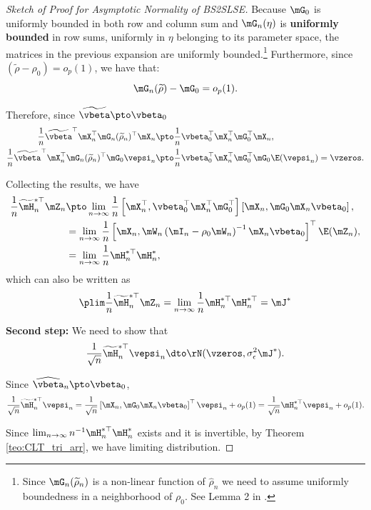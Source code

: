 \documentclass[english,12pt]{book}\usepackage[]{graphicx}\usepackage[]{xcolor}
\begin{document}
\begin{proof}[Sketch of Proof for Asymptotic Normality of BS2SLSE]
Because $\mG_0$ is uniformly bounded in both row and column sum and $\mG_n(\eta)$ is \textbf{uniformly bounded} in row sums, uniformly in $\eta$ belonging to its parameter space, the matrices in the previous expansion are uniformly bounded.\footnote{Since $\mG_n(\widetilde{\rho}_n)$ is a non-linear function of $\widehat{\rho}_n$ we need to assume uniformly boundedness in a neighborhood of $\rho_0$. See Lemma 2 in \cite{lee2003best}.} Furthermore, since $\left(\widetilde{\rho} - \rho_0\right) = o_p(1)$, we have that:
\begin{equation*}
\mG_n(\widetilde{\rho}) -  \mG_0  = o_p(1).
\end{equation*}

Therefore, since $\widetilde{\vbeta}\pto \vbeta_0$
\begin{equation*}
\begin{aligned}
\frac{1}{n}\widetilde{\vbeta}^\top\mX_n^\top \mG_n(\widetilde{\rho}_n)^\top\mX_n & \pto \frac{1}{n}\vbeta_0^\top\mX_n^\top \mG_0^\top\mX_n, \\
\frac{1}{n}\widetilde{\vbeta}^\top\mX_n^\top \mG_n(\widetilde{\rho}_n)^\top\mG_0\vepsi_n & \pto \frac{1}{n}\vbeta_0^\top\mX_n^\top \mG_0^\top\mG_0\E(\vepsi_n) = \vzeros.
\end{aligned}
\end{equation*}

Collecting the results, we have
\begin{equation*}
\begin{aligned}
  \frac{1}{n}\widetilde{\mH}^{*\top}_n \mZ_n & \pto \lim_{n \to \infty}\frac{1}{n}\left[ \mX_n^\top,  \vbeta_0^\top\mX_n^\top\mG_0^\top\right] \left[\mX_n, \mG_0\mX_n\vbeta_0\right], \\
   & = \lim_{n \to \infty}\frac{1}{n}\left[\mX_n, \mW_n\left(\mI_n - \rho_0\mW_n\right)^{-1}\mX_n\vbeta_0\right]^\top\E(\mZ_n), \\
   & = \lim_{n \to \infty} \frac{1}{n}\mH^{*\top}_n\mH^{*}_n,
  \end{aligned}
\end{equation*}
%
which can also be written as
\begin{equation*}
\plim \frac{1}{n}\widetilde{\mH}^{*\top}_n \mZ_n  = \lim_{n \to \infty} \frac{1}{n}\mH^{*\top}_n\mH^{*\top}_n = \mJ^*
\end{equation*}


\textbf{Second step:} We need to show that
\begin{equation*}
\frac{1}{\sqrt{n}}\widetilde{\mH}_n^{*\top}\vepsi_n \dto \rN(\vzeros, \sigma_{\epsilon}^2\mJ^*). 
\end{equation*}

Since $\widehat{\vbeta}_n \pto \vbeta_0$, 
\begin{equation*}
\frac{1}{\sqrt{n}}\widetilde{\mH}_n^{*\top}\vepsi_n = \frac{1}{\sqrt{n}}\left[\mX_n, \mG_0\mX_n\vbeta_0\right]^\top \vepsi_n + o_p(1) = \frac{1}{\sqrt{n}}\mH_n^{*\top}\vepsi_n + o_p(1).
\end{equation*}

Since $\lim_{n\to\infty}n^{-1}\mH_n^{*\top}\mH_n^{*}$ exists and it is invertible, by Theorem \ref{teo:CLT_tri_arr}, we have limiting distribution.
\end{proof}
\end{document}
